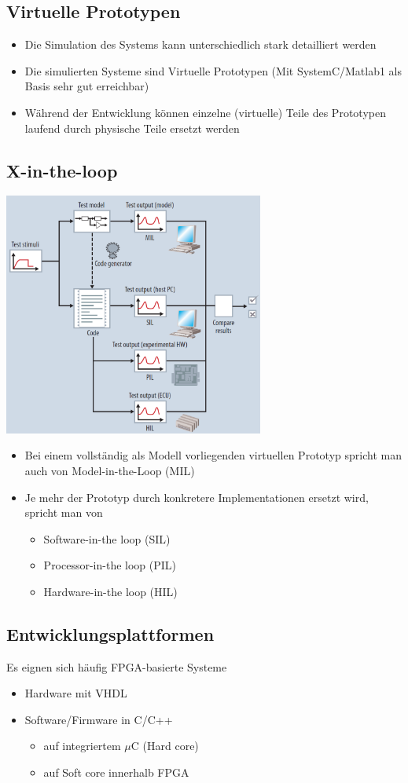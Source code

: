 \subsection{Virtuelle Prototypen}
	\begin{itemize}
		\item Die Simulation des Systems kann unterschiedlich stark detailliert werden
		\item Die simulierten Systeme sind Virtuelle Prototypen (Mit SystemC/Matlab1 als Basis sehr gut erreichbar)
		\item Während der Entwicklung können einzelne (virtuelle) Teile des Prototypen laufend durch physische Teile ersetzt werden
	\end{itemize}
\pagebreak\newpage

\subsection{X-in-the-loop}
	\begin{multicols}{2}
		\includegraphics[height=8cm]{images/HWSWCodesign/X-in-the-loop}
		\columnbreak
		\begin{itemize}
			\item Bei einem vollständig als Modell vorliegenden virtuellen Prototyp spricht man auch von Model-in-the-Loop (MIL)
			\item Je mehr der Prototyp durch konkretere Implementationen ersetzt wird, spricht man von
			\begin{itemize}
				\item Software-in-the loop (SIL)
				\item Processor-in-the loop (PIL)
				\item Hardware-in-the loop (HIL)
			\end{itemize}
		\end{itemize}
	\end{multicols}

	\subsection{Entwicklungsplattformen}
	Es eignen sich häufig FPGA-basierte Systeme
	\begin{itemize}
		\item Hardware mit VHDL
		\item Software/Firmware in C/C++
		\begin{itemize}
			\item auf integriertem $\mu$C (Hard core)
			\item auf Soft core innerhalb FPGA
		\end{itemize}
	\end{itemize}
